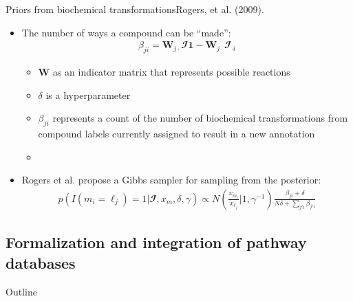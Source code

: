 \documentclass[xcolor=dvipsnames]{beamer}
\begin{document}
\begin{frame}{Priors from biochemical transformations}{Rogers, et al. (2009).}
	\vspace{-12pt}
	\begin{itemize}
		\item The number of ways a compound can be ``made'':
		\begin{align*}
		\beta_{ji}=\textbf{W}_{j \cdot} \mathbfcal{I} \textbf{1} - \textbf{W}_{j \cdot} \mathbfcal{I}_{\cdot i} 
		\end{align*}
		\begin{itemize}
					\item $\textbf{W}$ as an indicator matrix that represents possible reactions
					\item $\delta$ is a hyperparameter
					\item $\beta_{ji}$ represents a count of the number of biochemical transformations from compound labels currently assigned to result in a new annotation \pause
					\item[]
		\end{itemize}
		\item Rogers et al. propose a Gibbs sampler for sampling from the posterior:
			\begin{align*}
				p( I(m_i=\ell_j )=1|\mathbfcal{I},x_m,\delta,\gamma) \propto N \left( \frac{x_{m_i}}{x_{\ell_j}} | 1,\gamma^{-1} \right) \frac{\beta_{ji}+\delta}{N\delta+\sum_{j'i} \beta_{j'i}}
			\end{align*}
	\end{itemize}
\end{frame}

\subsection{Formalization and integration of pathway databases}
\begin{frame}{Outline}
	\vspace{-10.5pt}
	\tableofcontents[currentsection,subsectionstyle=show/shaded/hide]
\end{frame}
\end{document}
